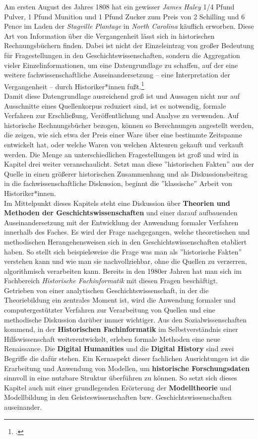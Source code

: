 \documentclass[12pt,a4paper]{article}
\begin{document}
Am ersten August des Jahres 1808 hat ein gewisser \textit{James Haley} 1/4 Pfund Pulver, 1 Pfund Munition und 1 Pfund Zucker zum Preis von 2 Schilling und 6 Pence im Laden der \textit{Stagville Plantage} in \textit{North Carolina} käuflich erworben. Diese Art von Information über die Vergangenheit lässt sich in historischen Rechnungsbüchern finden. Dabei ist nicht der Einzeleintrag von großer Bedeutung für Fragestellungen in den Geschichtswissenschaften, sondern die Aggregation vieler Einzelinformationen, um eine Datengrundlage zu schaffen, auf der eine weitere fachwissenschaftliche Auseinandersetzung -- eine Interpretation der Vergangenheit -- durch Historiker*innen fußt.\footcite[][06.06.2019]{vogeler2015mittelalterliche}
\\
Damit diese Datengrundlage ausreichend groß ist und Aussagen nicht nur auf Ausschnitte eines Quellenkorpus reduziert sind, ist es notwendig, formale Verfahren zur Erschließung, Veröffentlichung und Analyse zu verwenden. Auf historische Rechnungsbücher bezogen, können so Berechnungen angestellt werden, die zeigen, wie sich etwa der Preis einer Ware über eine bestimmte Zeitspanne entwickelt hat, oder welche Waren von welchen Akteuren gekauft und verkauft werden. Die Menge an unterschiedlichen Fragestellungen ist groß und wird in Kapitel drei weiter veranschaulicht. Setzt man diese ''historischen Fakten'' aus der Quelle in einen größerer historischen Zusammenhang und als Diskussionsbeitrag in die fachwissenschaftliche Diskussion, beginnt die ''klassische'' Arbeit von Historiker*innen. 
\\
Im Mittelpunkt dieses Kapitels steht eine Diskussion über \textbf{Theorien und Methoden der Geschichtswissenschaften} und einer darauf aufbauenden Auseinandersetzung mit der Entwicklung der Anwendung formaler Verfahren innerhalb des Faches. Es wird der Frage nachgegangen, welche theoretischen und methodischen Herangehensweisen sich in den Geschichtswissenschaften etabliert haben. So stellt sich beispielsweise die Frage was man als ''historische Fakten'' verstehen kann und wie man sie nachvollziehbar, ohne die Quellen zu verzerren, algorithmisch verarbeiten kann. Bereits in den 1980er Jahren hat man sich im Fachbereich \textit{Historische Fachinformatik} mit diesen Fragen beschäftigt.
\\
Getrieben von einer analytischen Geschichtswissenschaft, in der die Theoriebildung ein zentrales Moment ist, wird die Anwendung formaler und computergestützter Verfahren zur Verarbeitung von Quellen und eine methodische Diskussion darüber immer wichtiger. Aus den Sozialwissenschaften kommend, in der \textbf{Historischen Fachinformatik} im Selbstverständnis einer Hilfswissenschaft weiterentwickelt, erleben formale Methoden eine neue Renaissance. Die \textbf{Digital Humanities} und die \textbf{Digital History} sind zwei Begriffe die dafür stehen. Ein Kernaspekt dieser fachlichen Ausrichtungen ist die Erarbeitung und Anwendung von Modellen, um \textbf{historische Forschungsdaten} sinnvoll in eine nutzbare  Struktur überführen zu können. So setzt sich dieses Kapitel auch mit einer grundlegenden Erörterung der \textbf{Modelltheorie} und Modellbildung in den Geisteswissenschaften bzw. Geschichtswissenschaften auseinander.
\end{document}
